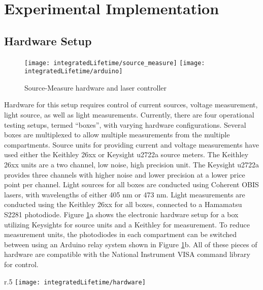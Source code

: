 \documentclass[../thesis.tex]{subfiles}
\begin{document}
\section{Experimental Implementation}
\subsection{Hardware Setup}

\begin{figure}[ht]
    \begin{minipage}{\linewidth}
    \centering
    \texttt{[image: integratedLifetime/source\_measure]}
    \texttt{[image: integratedLifetime/arduino]}
    \caption{Source-Measure hardware and laser controller}
    \label{fig:source_measure}
    \end{minipage}
\end{figure}

Hardware for this setup requires control of current sources, voltage measurement, light source, as well as light measurements. 
Currently, there are four operational testing setups, termed ``boxes'', with varying hardware configurations.
Several boxes are multiplexed to allow multiple measurements from the multiple compartments.
Source units for providing current and voltage measurements have used either the Keithley 26xx or Keysight u2722a source meters.  
The Keithley 26xx units are a two channel, low noise, high precision unit.
The Keysight u2722a provides three channels with higher noise and lower precision at a lower price point per channel.
Light sources for all boxes are conducted using Coherent OBIS lasers, with wavelengths of either 405 nm or 473 nm.
Light measurements are conducted using the Keithley 26xx for all boxes, connected to a Hamamatsu S2281 photodiode.
Figure \ref{fig:source_measure}a shows the electronic hardware setup for a box utilizing Keysights for source units and a Keithley for measurement.
To reduce measurement units, the photodiodes in each compartment can be switched between using an Arduino relay system shown in Figure \ref{fig:source_measure}b.
All of these pieces of hardware are compatible with the National Instrument VISA command library for control.

\begin{wrapfigure}{r}{.5\textwidth}
\centering
\texttt{[image: integratedLifetime/hardware]}
\caption{Device contacting, measurement, and optical hardware.  Version 3 of the hardware is shown.  Controlling hardware is shown in Fig. \ref{fig:source_measure}}
\label{fig:hardware}
\end{wrapfigure}
\end{document}
